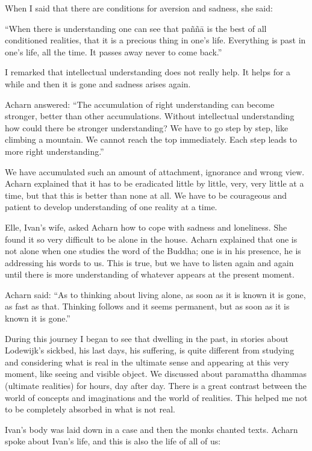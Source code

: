When I said that there are conditions for aversion and sadness, she
said:

``When there is understanding one can see that paññā is the best of all
conditioned realities, that it is a precious thing in one's life.
Everything is past in one's life, all the time. It passes away never to
come back.''

I remarked that intellectual understanding does not really help. It
helps for a while and then it is gone and sadness arises again.

Acharn answered: ``The accumulation of right understanding can become
stronger, better than other accumulations. Without intellectual
understanding how could there be stronger understanding? We have to go
step by step, like climbing a mountain. We cannot reach the top
immediately. Each step leads to more right understanding.''

We have accumulated such an amount of attachment, ignorance and wrong
view. Acharn explained that it has to be eradicated little by little,
very, very little at a time, but that this is better than none at all.
We have to be courageous and patient to develop understanding of one
reality at a time.

Elle, Ivan's wife, asked Acharn how to cope with sadness and loneliness.
She found it so very difficult to be alone in the house. Acharn
explained that one is not alone when one studies the word of the Buddha;
one is in his presence, he is addressing his words to us. This is true,
but we have to listen again and again until there is more understanding
of whatever appears at the present moment.

Acharn said: ``As to thinking about living alone, as soon as it is known
it is gone, as fast as that. Thinking follows and it seems permanent,
but as soon as it is known it is gone.''

During this journey I began to see that dwelling in the past, in stories
about Lodewijk's sickbed, his last days, his suffering, is quite
different from studying and considering what is real in the ultimate
sense and appearing at this very moment, like seeing and visible object.
We discussed about paramattha dhammas (ultimate realities) for hours,
day after day. There is a great contrast between the world of concepts
and imaginations and the world of realities. This helped me not to be
completely absorbed in what is not real.

Ivan's body was laid down in a case and then the monks chanted texts.
Acharn spoke about Ivan's life, and this is also the life of all of us:

